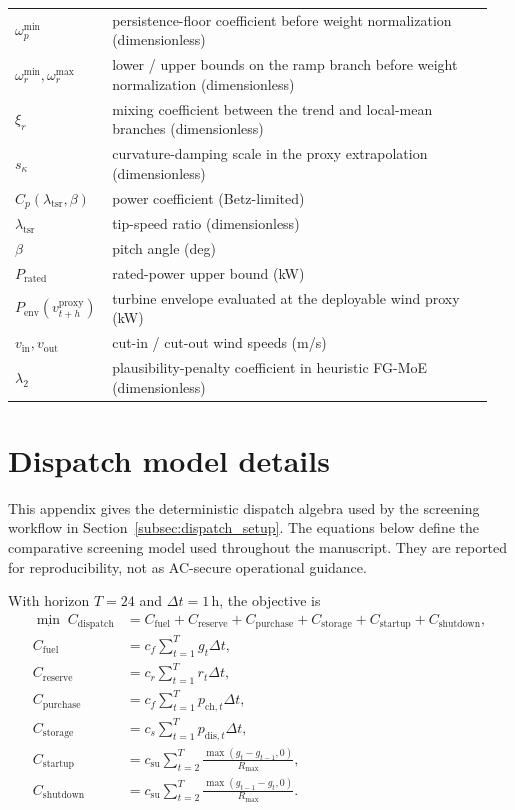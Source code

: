 \documentclass[review,1p,times]{elsarticle}
\begin{document}
\begin{longtable}{@{}p{0.17\linewidth}L{0.78\linewidth}@{}}
$\omega_p^{\min}$ & persistence-floor coefficient before weight normalization (dimensionless) \\
$\omega_r^{\min},\omega_r^{\max}$ & lower / upper bounds on the ramp branch before weight normalization (dimensionless) \\
$\xi_r$ & mixing coefficient between the trend and local-mean branches (dimensionless) \\
$s_\kappa$ & curvature-damping scale in the proxy extrapolation (dimensionless) \\
$C_p(\lambda_{\mathrm{tsr}},\beta)$ & power coefficient (Betz-limited) \\
$\lambda_{\mathrm{tsr}}$ & tip-speed ratio (dimensionless) \\
$\beta$ & pitch angle (deg) \\
$P_{\mathrm{rated}}$ & rated-power upper bound (kW) \\
$P_{\mathrm{env}}(v_{t+h}^{\mathrm{proxy}})$ & turbine envelope evaluated at the deployable wind proxy (kW) \\
$v_{\mathrm{in}}, v_{\mathrm{out}}$ & cut-in / cut-out wind speeds (m/s) \\
$\lambda_2$ & plausibility-penalty coefficient in heuristic FG-MoE (dimensionless) \\
\end{longtable}
\linenumbers
\endgroup

\section{Dispatch model details}\label{app:dispatch_details}
This appendix gives the deterministic dispatch algebra used by the screening workflow in Section~\ref{subsec:dispatch_setup}. The equations below define the comparative screening model used throughout the manuscript. They are reported for reproducibility, not as AC-secure operational guidance.

With horizon $T=24$ and $\Delta t=1$\,h, the objective is
\begin{align}
\min_{\cdot}\; C_{\text{dispatch}} &= C_{\text{fuel}} + C_{\text{reserve}} + C_{\text{purchase}} + C_{\text{storage}} + C_{\text{startup}} + C_{\text{shutdown}}, \label{eq:app_dispatch_obj}\\
C_{\text{fuel}} &= c_f\sum_{t=1}^{T} g_t\Delta t, \nonumber\\
C_{\text{reserve}} &= c_r\sum_{t=1}^{T} r_t\Delta t, \nonumber\\
C_{\text{purchase}} &= c_f\sum_{t=1}^{T} p_{\text{ch},t}\Delta t, \nonumber\\
C_{\text{storage}} &= c_s\sum_{t=1}^{T} p_{\text{dis},t}\Delta t, \nonumber\\
C_{\text{startup}} &= c_{\text{su}}\sum_{t=2}^{T}\frac{\max(g_t-g_{t-1},0)}{R_{\max}}, \nonumber\\
C_{\text{shutdown}} &= c_{\text{su}}\sum_{t=2}^{T}\frac{\max(g_{t-1}-g_t,0)}{R_{\max}}. \nonumber
\end{align}
\end{document}
